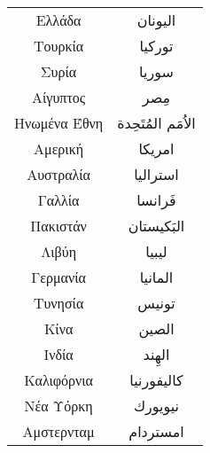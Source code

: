 \documentclass[twocolumn,a4paper]{article}
\newcommand{\ar}[1]{\textarabic{#1}}
\begin{document}
\begin{supertabular}{ c c }
Ελλάδα       & \ar{ اليونان } \\
Τουρκία      & \ar{ توركيا } \\
Συρία        & \ar{ سوريا } \\
Αίγυπτος     & \ar{ مِصر } \\
Ηνωμένα Έθνη & \ar{ اﻻُمَم المُتَحِدة } \\
Αμερική      & \ar{ امريكا } \\
Αυστραλία    & \ar{ استراليا } \\
Γαλλία       & \ar{ فَرانسا } \\
Πακιστάν     & \ar{ البَكيستان } \\
Λιβύη        & \ar{ ليبيا } \\
Γερμανία     & \ar{ المانيا } \\
Τυνησία      & \ar{ تونيس } \\
Κίνα         & \ar{ الصين } \\
Ινδία        & \ar{ الهِند } \\
Καλιφόρνια   & \ar{ كاليفورنيا } \\
Νέα Υόρκη    & \ar{ نيويورك } \\
Αμστερνταμ   & \ar{ امستردام } \\
\end{supertabular}
\end{document}
